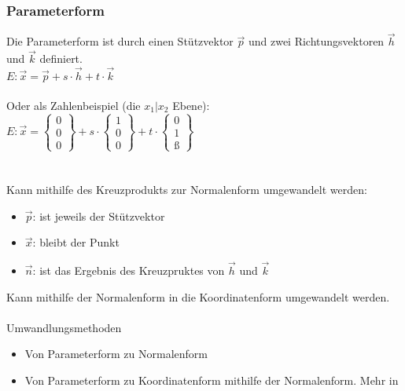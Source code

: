 
\subsubsection{Parameterform}
Die Parameterform ist durch einen Stützvektor $\vec{p}$ und zwei Richtungsvektoren $\vec{h}$ und $\vec{k}$ definiert. \\
$
E: \vec{x} = \vec{p} + s\cdot\vec{h} + t\cdot\vec{k}
$
\\\\
Oder als Zahlenbeispiel (die $x_1 | x_2$ Ebene): \\
$
E: \vec{x} = 
\begin{Bmatrix}
    0 \\ 0 \\ 0
\end{Bmatrix}
 + s \cdot
\begin{Bmatrix}
    1 \\ 0 \\ 0
\end{Bmatrix}
 + t \cdot 
 \begin{Bmatrix}
    0 \\ 1 \\ ß
 \end{Bmatrix}
$
\\\\\\
Kann mithilfe des Kreuzprodukts zur Normalenform umgewandelt werden: \\
\begin{itemize}
    \item $\vec{p}$: ist jeweils der Stützvektor
    \item $\vec{x}$: bleibt der Punkt
    \item $\vec{n}$: ist das Ergebnis des Kreuzpruktes von $\vec{h}$ und $\vec{k}$
\end{itemize}
Kann mithilfe der Normalenform in die Koordinatenform umgewandelt werden. \\\\
Umwandlungsmethoden
\begin{itemize}
    \item Von Parameterform zu Normalenform
    \item Von Parameterform zu Koordinatenform mithilfe der Normalenform. 
        Mehr in 
\end{itemize}
